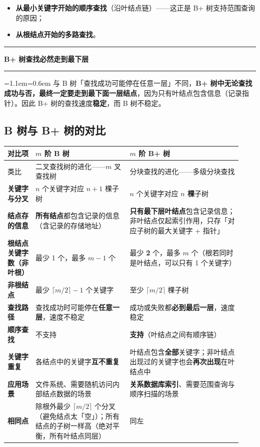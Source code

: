 \documentclass[11pt,openany,UTF8]{ctexbook}
\newcommand{\callouthead}[2]{%
  \par\addvspace{7pt}\noindent
  {\color{#1}\rule[-0.15em]{3pt}{1.05em}}\hspace{0.5em}%
  {\bfseries\color{#1}#2}\par\nobreak\vspace{-0.35em}%
  {\color{rulesep}\hrule height 0.4pt}\nobreak\vspace{0.45em}%
  \begingroup\small\setlength{\parindent}{0pt}%
  \leftskip=1.1em\rightskip=0.6em\noindent\ignorespaces}
\newcommand{\calloutend}{\par\endgroup\addvspace{7pt}}
\newenvironment{callwarn}[1]{\callouthead{warnbar}{#1}}{\calloutend}
\begin{document}
\begin{itemize}
\item \textbf{从最小关键字开始的顺序查找}（沿叶结点链）——这正是 B+ 树支持范围查询的原因；
\item \textbf{从根结点开始的多路查找}。
\end{itemize}
\begin{callwarn}{B+ 树查找必然走到最下层}
与 B 树「查找成功可能停在任意一层」不同，\textbf{B+ 树中无论查找成功与否，最终一定要走到最下面一层结点}，因为只有叶结点包含信息（记录指针）。因此 B+ 树的查找速度\textbf{稳定}，而 B 树不稳定。

\end{callwarn}

\subsection{B 树与 B+ 树的对比}

\begingroup\small\setlength{\tabcolsep}{4.0pt}
\begin{longtable}{@{}L{0.1134\linewidth}L{0.3723\linewidth}L{0.4429\linewidth}@{}}
\toprule
\textbf{对比项} & \textbf{$m$ 阶 B 树} & \textbf{$m$ 阶 B+ 树} \\
\midrule
\endhead
类比 & 二叉查找树的进化——$m$ 叉查找树 & 分块查找的进化——多级分块查找 \\
\textbf{关键字与分叉} & $n$ 个关键字对应 $n+1$ 棵子树 & $n$ 个关键字对应 \textbf{$n$ 棵}子树 \\
\textbf{结点存的信息} & \textbf{所有结点}都包含记录的信息（含记录的存储地址） & \textbf{只有最下层叶结点}包含记录信息；非叶结点仅起索引作用，只存「对应子树的最大关键字 + 指针」 \\
\textbf{根结点关键字数（非叶根）} & 最少 1 个，最多 $m-1$ 个 & 最少 \textbf{2} 个，最多 $m$ 个（根若同时是叶结点，可以只有 1 个关键字） \\
\textbf{非根结点} & 最少 $\lceil m/2\rceil-1$ 个关键字 & 至少 $\lceil m/2\rceil$ 棵子树 \\
\textbf{查找路径} & 查找成功时可能停在\textbf{任意一层}，速度不稳定 & 成功或失败都\textbf{必到最后一层}，速度稳定 \\
\textbf{顺序查找} & 不支持 & \textbf{支持}（叶结点之间有顺序链） \\
\textbf{关键字重复} & 各结点中的关键字\textbf{互不重复} & 叶结点包含\textbf{全部}关键字；非叶结点出现过的关键字也会\textbf{再次出现}在叶结点中 \\
\textbf{应用场景} & 文件系统、需要随机访问内部结点数据的场景 & \textbf{关系数据库索引}、需要范围查询与顺序扫描的场景 \\
\textbf{相同点} & 除根外最少 $\lceil m/2\rceil$ 个分叉（避免结点太「空」）；所有结点的子树一样高（绝对平衡，所有叶结点同层） & 同左 \\
\bottomrule
\end{longtable}
\endgroup
\end{document}
